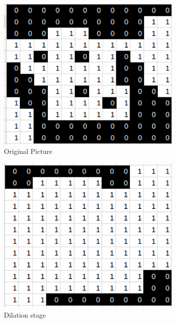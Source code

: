 \documentclass[11pt]{report}
\begin{document}
\begin{figure}
	\centering
	\begin{subfigure}{.32\textwidth}
		\centering
		\includegraphics[scale=0.27]{pics/closing_o}
		\caption{Original Picture}
	\end{subfigure}
	\hfill
	\begin{subfigure}{.32\textwidth}
		\centering
		\includegraphics[scale=0.27]{pics/closing_d}
		\caption{Dilation stage}
	\end{subfigure}
	\hfill
	\begin{subfigure}{.32\textwidth}

\end{subfigure}
\end{figure}
\end{document}
